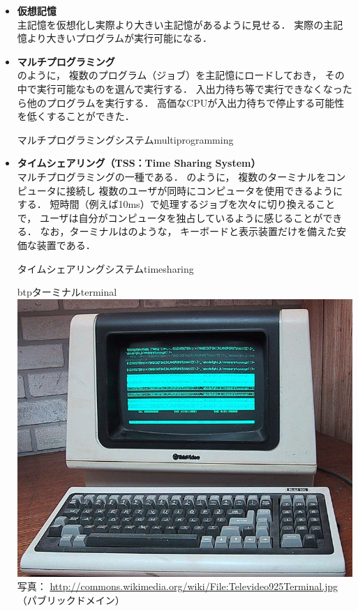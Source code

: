 \begin{itemize}
\item {\bf 仮想記憶} \\
主記憶を仮想化し実際より大きい主記憶があるように見せる．
実際の主記憶より大きいプログラムが実行可能になる．

\item {\bf マルチプログラミング} \\
\label{multiprogramming}
のように，
複数のプログラム（ジョブ）を主記憶にロードしておき，
その中で実行可能なものを選んで実行する．
入出力待ち等で実行できなくなったら他のプログラムを実行する．
高価なCPUが入出力待ちで停止する可能性を低くすることができた．

{マルチプログラミングシステム}{multiprogramming}

\item {\bf タイムシェアリング（TSS：Time Sharing System）} \\
マルチプログラミングの一種である．
のように，
複数のターミナルをコンピュータに接続し
複数のユーザが同時にコンピュータを使用できるようにする．
短時間（例えば10ms）で処理するジョブを次々に切り換えることで，
ユーザは自分がコンピュータを独占しているように感じることができる．
なお，ターミナルはのような，
キーボードと表示装置だけを備えた安価な装置である．

{タイムシェアリングシステム}{timesharing}

\begin{myfig}{btp}{ターミナル}{terminal}
\includegraphics[scale=0.25]{Photo/724px-Televideo925Terminal.jpeg}\\
{\small 写真：
\url{http://commons.wikimedia.org/wiki/File:Televideo925Terminal.jpg}
（パブリックドメイン）}
\end{myfig}

\end{itemize}

